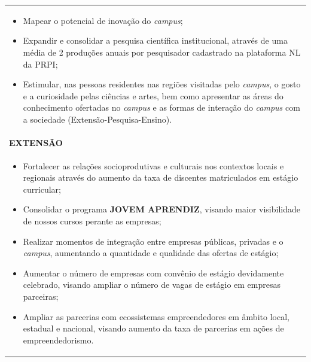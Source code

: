 \documentclass[
	12pt,				%
	openright,			%
	twoside,			%
	a4paper,			%
	chapter=TITLE,		%
	english,			%
	french,				%
	spanish,			%
	brazil,				%
	]{abntex2}
\begin{document}
\begin{quadro}[h]
{\begin{tabular}{ p{.97\linewidth} }
\begin{itemize}
            \item Mapear o potencial de inovação do  \textit{campus};
            
            \item Expandir e consolidar a pesquisa científica institucional, através de uma média de 2 produções anuais por pesquisador cadastrado na plataforma NL da PRPI;
            
            \item Estimular, nas pessoas residentes nas regiões visitadas pelo \textit{campus}, o gosto e a curiosidade pelas ciências e artes, bem como apresentar as áreas do conhecimento ofertadas no \textit{campus} e as formas de interação do \textit{campus} com a sociedade (Extensão-Pesquisa-Ensino).
        \end{itemize} \\
        \vspace{-0.5em}
        
        \cellcolor{gray!20}\bfseries EXTENSÃO  \\
        \vspace{-1em}
        \small
        \begin{itemize}
            \setlength\itemsep{0em}
        
            \item Fortalecer as relações socioprodutivas e culturais nos contextos locais e regionais através do aumento da taxa de discentes matriculados em estágio curricular; 
        
            \item  Consolidar o programa \textbf{JOVEM APRENDIZ}, visando maior visibilidade de nossos cursos perante as empresas;
        
            \item  Realizar momentos de integração entre empresas públicas, privadas e o \textit{campus}, aumentando a quantidade e qualidade das ofertas de estágio;
        
            \item Aumentar o número de empresas com convênio de estágio devidamente celebrado, visando ampliar o número de vagas de estágio em empresas parceiras; 
        
            \item  Ampliar as parcerias com ecossistemas empreendedores em âmbito local, estadual e nacional, visando aumento da taxa de parcerias em ações de empreendedorismo.\vspace{-1em}
        \end{itemize}  \\
        \bottomrule
    \end{tabular}
}
{
}
\end{quadro}
\end{document}
